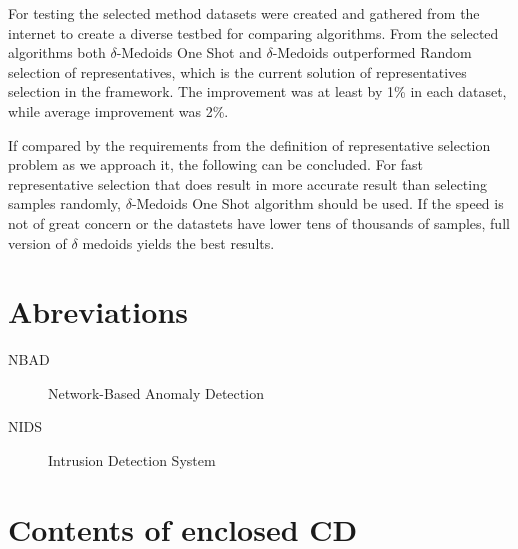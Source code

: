 \documentclass[thesis=B,english]{FITthesis}[2012/10/20]
\begin{document}
For testing the selected method datasets were created and gathered from the internet to create a diverse testbed for comparing algorithms.
From the selected algorithms both $\delta$-Medoids One Shot and $\delta$-Medoids outperformed Random selection of representatives, which is the current solution of representatives selection in the framework.
The improvement was at least by 1\% in each dataset, while average improvement was 2\%. 


If compared by the requirements from the definition of representative selection problem as we approach it, the following can be concluded.
For fast representative selection that does result in more accurate result than selecting samples randomly, $\delta$-Medoids One Shot algorithm should be used.
If the speed is not of great concern or the datastets have lower tens of thousands of samples, full version of $\delta$ medoids yields the best results.




\appendix

\chapter{Abreviations}
\begin{description}
	\item[NBAD] Network-Based Anomaly Detection
	\item[NIDS] Intrusion Detection System
\end{description}


\chapter{Contents of enclosed CD}


\begin{figure}
\end{figure}
\end{document}
